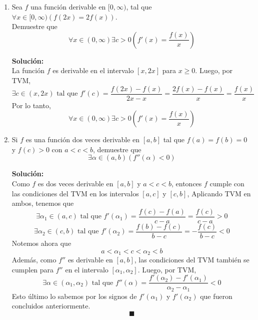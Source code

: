 \documentclass[12pt]{article}
\newenvironment{solucion}
{\begin{mdframed}[backgroundcolor=black!10]
		{\bf Solución:}\\
	}
	{
	\end{mdframed}
}
\newenvironment{preguntas}
{\begin{enumerate}\itemsep12pt
	}
	{
	\end{enumerate}
}
\begin{document}
\begin{preguntas}
\begin{solucion}
En conclusión, la ecuación tiene solución única. 
$$\blacksquare$$
\end{solucion}
\item Sea $f$ una función derivable en $[0, \infty)$, tal que $\forall x \in [0, \infty)(f(2x)=2f(x))$.\\
Demuestre que
$$\forall x \in (0, \infty) \exists c > 0 \left(f'(x) = \dfrac{f(x)}{x}\right)$$
\begin{solucion}
La función $f$ es derivable en el intervalo $[x, 2x]$ para $x \geq 0$. Luego, por TVM,
$$\exists c \in (x,2x) \text{ tal que } f'(c) = \dfrac{f(2x)-f(x)}{2x-x} = \dfrac{2f(x)-f(x)}{x} = \dfrac{f(x)}{x}$$
Por lo tanto,
$$\forall x \in (0, \infty) \exists c > 0 \left(f'(x) = \dfrac{f(x)}{x}\right)$$
\end{solucion}
\item Si $f$ es una función dos veces derivable en $[a,b]$ tal que $f(a)=f(b)=0$ y $f(c) > 0$ con $a < c < b$, demuestre que
$$\exists \alpha \in (a,b) (f''(\alpha) < 0)$$
\begin{solucion}
Como $f$ es dos veces derivable en $[a,b]$ y $a < c < b$, entonces $f$ cumple con las condiciones del TVM en los intervalos $[a,c]$ y $[c,b]$, Aplicando TVM en ambos, tenemos que
$$\exists \alpha_1 \in (a,c) \text{ tal que } f'(\alpha_1) = \dfrac{f(c)-f(a)}{c-a} = \dfrac{f(c)}{c-a} > 0$$
$$\exists \alpha_2 \in (c,b) \text{ tal que } f'(\alpha_2) = \dfrac{f(b)-f(c)}{b-c} = -\dfrac{f(c)}{b-c} < 0$$
Notemos ahora que 
$$a < \alpha_1 < c < \alpha_2 < b$$
Además, como $f''$ es derivable en $[a, b]$, las condiciones del TVM también se cumplen para $f''$ en el intervalo $[\alpha_1, \alpha_2]$. Luego, por TVM,
$$\exists \alpha \in (\alpha_1, \alpha_2) \text{ tal que } f''(\alpha) = \dfrac{f'(\alpha_2) - f'(\alpha_1)}{\alpha_2 - \alpha_1} < 0$$
Esto último lo sabemos por los signos de $f'(\alpha_1)$ y $f'(\alpha_2)$ que fueron concluidos anteriormente.
$$\blacksquare$$
\end{solucion}
\end{preguntas}
\end{document}
